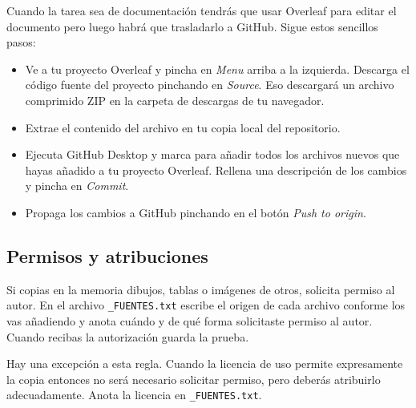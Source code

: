 Cuando la tarea sea de documentación tendrás que usar Overleaf para editar el documento pero luego habrá que trasladarlo a GitHub.  Sigue estos sencillos pasos:

\begin{itemize}
\item Ve a tu proyecto Overleaf y pincha en \emph{Menu} arriba a la izquierda.  Descarga el código fuente del proyecto pinchando en \emph{Source}.  Eso descargará un archivo comprimido ZIP en la carpeta de descargas de tu navegador.  

\item Extrae el contenido del archivo en tu copia local del repositorio.

\item Ejecuta GitHub Desktop y marca para añadir todos los archivos nuevos que hayas añadido a tu proyecto Overleaf.  Rellena una descripción de los cambios y pincha en \emph{Commit}.

\item Propaga los cambios a GitHub pinchando en el botón \emph{Push to origin}.
\end{itemize}

\subsection{Permisos y atribuciones}
\label{sec:permisos-atribuciones}

Si copias en la memoria dibujos, tablas o imágenes de otros, solicita permiso al autor.  En el archivo \texttt{\_FUENTES.txt} escribe el origen de cada archivo conforme los vas añadiendo y anota cuándo y de qué forma solicitaste permiso al autor.  Cuando recibas la autorización guarda la prueba.

Hay una excepción a esta regla.  Cuando la licencia de uso permite expresamente la copia entonces no será necesario solicitar permiso, pero deberás atribuirlo adecuadamente.  Anota la licencia en \texttt{\_FUENTES.txt}.